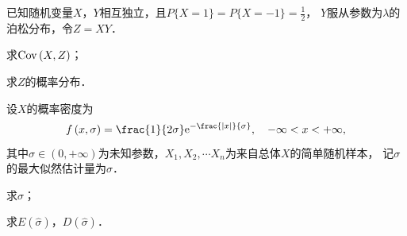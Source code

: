 \documentclass[plain,noanswer,medmath]{../../template/jnuexam}
\begin{document}
\begin{problem}[points=11]
已知随机变量$X$，$Y$相互独立，且$P\{X = 1\} = P\{X = - 1\} = \frac{1}{2}$，
$Y$服从参数为$\lambda$的泊松分布，令$Z = XY$．\par
\begin{enumerate*}
\item 求$\operatorname{Cov} \left(X,Z \right)$；
\item 求$Z$的概率分布．
\end{enumerate*}
\end{problem}


\begin{problem}[points=11]
设$X$的概率密度为
$$f\left(x,\sigma \right) = \frac{1}{2\sigma}\e^{- \frac{|x|}{\sigma}},\quad -\infty < x < +\infty ,$$
其中$\sigma \in (0,+\infty)$为未知参数，$X_1,X_2, \cdots X_n$为来自总体$X$的简单随机样本，
记$\sigma$的最大似然估计量为$\hat{\sigma}$．\par
\begin{enumerate*}
\item 求$\hat{\sigma}$；
\item 求$E\left(\hat{\sigma} \right)$，$D\left(\hat{\sigma} \right)$．
\end{enumerate*}
\end{problem}
\end{document}
